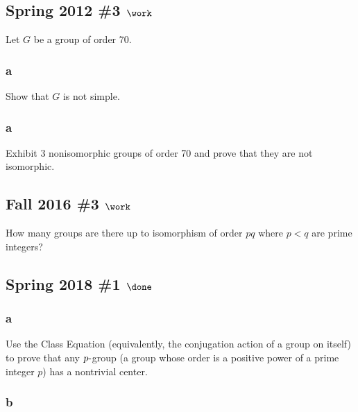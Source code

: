\hypertarget{spring-2012-3-work}{%
\subsection{\texorpdfstring{Spring 2012 \#3
\(\work\)}{Spring 2012 \#3 \textbackslash work}}\label{spring-2012-3-work}}

Let \(G\) be a group of order 70.

\hypertarget{a-21}{%
\subsubsection{a}\label{a-21}}

Show that \(G\) is not simple.

\hypertarget{a-22}{%
\subsubsection{a}\label{a-22}}

Exhibit 3 nonisomorphic groups of order 70 and prove that they are not
isomorphic.

\hypertarget{fall-2016-3-work}{%
\subsection{\texorpdfstring{Fall 2016 \#3
\(\work\)}{Fall 2016 \#3 \textbackslash work}}\label{fall-2016-3-work}}

How many groups are there up to isomorphism of order \(pq\) where
\(p<q\) are prime integers?

\hypertarget{spring-2018-1-done}{%
\subsection{\texorpdfstring{Spring 2018 \#1
\(\done\)}{Spring 2018 \#1 \textbackslash done}}\label{spring-2018-1-done}}

\hypertarget{a-23}{%
\subsubsection{a}\label{a-23}}

Use the Class Equation (equivalently, the conjugation action of a group
on itself) to prove that any \(p{\hbox{-}}\)group (a group whose order
is a positive power of a prime integer \(p\)) has a nontrivial center.

\hypertarget{b-19}{%
\subsubsection{b}\label{b-19}}

